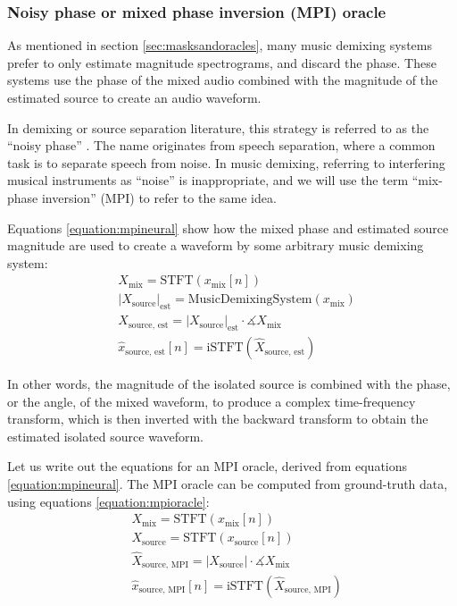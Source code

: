 \documentclass[report.tex]{subfiles}
\begin{document}
\subsubsection{Noisy phase or mixed phase inversion (MPI) oracle}
\label{sec:noisyphaseoracle}

As mentioned in section \ref{sec:masksandoracles}, many music demixing systems prefer to only estimate magnitude spectrograms, and discard the phase. These systems use the phase of the mixed audio combined with the magnitude of the estimated source to create an audio waveform.

In demixing or source separation literature, this strategy is referred to as the ``noisy phase'' \parencite{noisyphase1, noisyphase2}. The name originates from speech separation, where a common task is to separate speech from noise. In music demixing, referring to interfering musical instruments as ``noise'' is inappropriate, and we will use the term ``mix-phase inversion'' (MPI) to refer to the same idea.

Equations \eqref{equation:mpineural} show how the mixed phase and estimated source magnitude are used to create a waveform by some arbitrary music demixing system:
\begin{align}\tag{29}\label{equation:mpineural}
	\nonumber & X_{\text{mix}} = \text{STFT}(x_{\text{mix}}[n])\\
	\nonumber & {|X_{\text{source}}|}_{\text{est}} = \text{MusicDemixingSystem}(x_{\text{mix}})\\
	\nonumber & X_{\text{source, est}} = {|X_{\text{source}}|}_{\text{est}} \cdot \measuredangle{X_{\text{mix}}}\\
	\nonumber & \hat{x}_{\text{source, est}}[n] = \text{iSTFT}(\hat{X}_{\text{source, est}})
\end{align}

In other words, the magnitude of the isolated source is combined with the phase, or the angle, of the mixed waveform, to produce a complex time-frequency transform, which is then inverted with the backward transform to obtain the estimated isolated source waveform. 

Let us write out the equations for an MPI oracle, derived from equations \eqref{equation:mpineural}. The MPI oracle can be computed from ground-truth data, using equations \eqref{equation:mpioracle}:
\begin{align}\tag{30}\label{equation:mpioracle}
	\nonumber & X_{\text{mix}} = \text{STFT}(x_{\text{mix}}[n])\\
	\nonumber & X_{\text{source}} = \text{STFT}(x_{\text{source}}[n])\\
	\nonumber & \hat{X}_{\text{source, MPI}} = |X_{\text{source}}| \cdot \measuredangle{X_{\text{mix}}}\\
	\nonumber & \hat{x}_{\text{source, MPI}}[n] = \text{iSTFT}(\hat{X}_{\text{source, MPI}})
\end{align}
\end{document}
